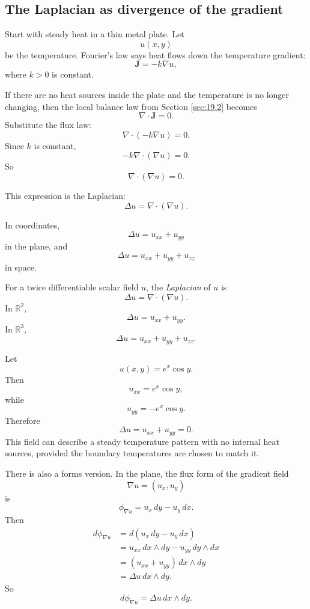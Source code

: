 \subsection{The Laplacian as divergence of the gradient}

Start with steady heat in a thin metal plate.  Let
\[
    u(x,y)
\]
be the temperature.  Fourier's law says heat flows down the temperature gradient:
\[
    \mathbf J=-k\nabla u,
\]
where \(k>0\) is constant.

If there are no heat sources inside the plate and the temperature is no longer changing,
then the local balance law from Section \ref{sec:19.2} becomes
\[
    \nabla\cdot\mathbf J=0.
\]
Substitute the flux law:
\[
    \nabla\cdot(-k\nabla u)=0.
\]
Since \(k\) is constant,
\[
    -k\nabla\cdot(\nabla u)=0.
\]
So
\[
\boxed{
    \nabla\cdot(\nabla u)=0.
}
\]

This expression is the Laplacian:
\[
\boxed{
    \Delta u=\nabla\cdot(\nabla u).
}
\]

In coordinates,
\[
\boxed{
    \Delta u=u_{xx}+u_{yy}
}
\]
in the plane, and
\[
\boxed{
    \Delta u=u_{xx}+u_{yy}+u_{zz}
}
\]
in space.

\begin{definition}[Laplacian]
For a twice differentiable scalar field \(u\), the \emph{Laplacian} of \(u\) is
\[
\boxed{
    \Delta u=\nabla\cdot(\nabla u).
}
\]
In \(\mathbb R^2\),
\[
    \Delta u=u_{xx}+u_{yy}.
\]
In \(\mathbb R^3\),
\[
    \Delta u=u_{xx}+u_{yy}+u_{zz}.
\]
\end{definition}

\begin{example}
Let
\[
    u(x,y)=e^x\cos y.
\]
Then
\[
    u_{xx}=e^x\cos y,
\]
while
\[
    u_{yy}=-e^x\cos y.
\]
Therefore
\[
    \Delta u=u_{xx}+u_{yy}=0.
\]
This field can describe a steady temperature pattern with no internal heat sources,
provided the boundary temperatures are chosen to match it.
\end{example}

There is also a forms version.  In the plane, the flux form of the gradient field
\[
    \nabla u=(u_x,u_y)
\]
is
\[
\boxed{
    \phi_{\nabla u}=u_x\,dy-u_y\,dx.
}
\]
Then
\[
\begin{aligned}
d\phi_{\nabla u}
&=
d(u_x\,dy-u_y\,dx)\\
&=
u_{xx}\,dx\wedge dy-u_{yy}\,dy\wedge dx\\
&=
(u_{xx}+u_{yy})\,dx\wedge dy\\
&=
\Delta u\,dx\wedge dy.
\end{aligned}
\]
So
\[
\boxed{
    d\phi_{\nabla u}=\Delta u\,dx\wedge dy.
}
\]

